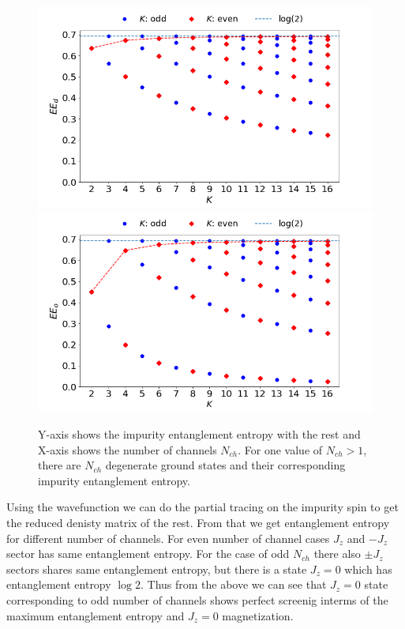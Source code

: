 \documentclass[reprint,prb,superscriptaddress]{revtex4-1}
\begin{document}
\begin{figure}[!h]
\centering
\includegraphics[scale=0.32]{plt/EE_multi_channel_ANN.png}
\includegraphics[scale=0.32]{plt/outer_EE_multi_channel_ANN.png}
\caption{Y-axis shows the impurity entanglement entropy with the rest and X-axis shows the number of channels $N_{ch}$. For one value of $N_{ch}>1$, there are $N_{ch}$ degenerate ground states and their corresponding impurity entanglement entropy. }
\end{figure}

\noindent Using the wavefunction we can do the partial tracing on the impurity spin to get the reduced denisty matrix of the rest. From that we get entanglement entropy for different number of channels. For even number of channel cases $J_z$ and $-J_z$ sector has same entanglement entropy. For the case of odd $N_{ch}$ there also $\pm J_z$ sectors shares same entanglement entropy, but there is a state $J_z=0$ which has entanglement entropy $\log 2$. Thus from the above we can see that $J_z=0$ state corresponding to odd number of channels shows perfect screenig interms of the maximum entanglement entropy and $J_z=0$ magnetization.
\end{document}
